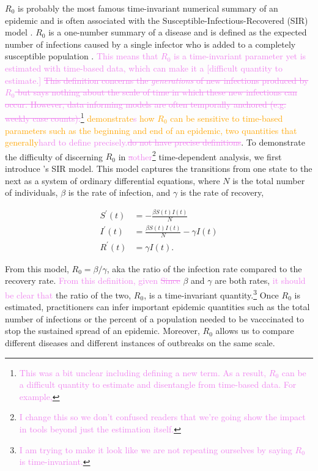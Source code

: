 \documentclass[
  shortnames]{jss}
\begin{document}
\(R_0\) is probably the most famous time-invariant numerical summary of
an epidemic and is often associated with the
Susceptible-Infectious-Recovered (SIR) model \citep{hethcote2000}.
\(R_0\) is a one-number summary of a disease and is defined as the
expected number of infections caused by a single infector who is added
to a completely susceptible population \citep{anderson1992}.
\textcolor{violet}{This means that $R_0$ is a time-invariant parameter yet is estimated with time-based data, which can make it a [difficult quantity to estimate.]}
\textcolor{violet}{\sout{This definition concerns the \textit{generations} of new infections produced by $R_0$ but says nothing about the scale of time in which these new infections can occur.  However, data informing models are often temporally anchored (e.g. weekly case counts).}}\footnote{\textcolor{violet}{This was a bit unclear including defining a new term.   As a result, $R_0$ can be a difficult quantity to estimate and disentangle from time-based data.  For example,}}\textcolor{orange}{ \cite{Gallagher2020} demonstrate\textcolor{violet}{s} how $R_0$ can be sensitive to time-based parameters such as the beginning and end of an epidemic, two quantities that generally}\textcolor{violet}{hard to define precisely.\sout{do not have precise definitions}}.
To demonstrate the difficulty of discerning \(R_0\) in
\textcolor{violet}{\sout{a}other}\footnote{\textcolor{violet}{I change this so we don't confused readers that we're going show the impact in tools beyond just the estimation itself.}}
time-dependent analysis, we first introduce \citet{Kermack1927}'s SIR
model. This model captures the transitions from one state to the next as
a system of ordinary differential equations, where \(N\) is the total
number of individuals, \(\beta\) is the rate of infection, and
\(\gamma\) is the rate of recovery,

\begin{align}\label{eq:sir-ode}
    S^\prime(t) &= -\frac{\beta S(t)I(t)}{N} \\
    I^\prime(t) &= \frac{\beta S(t)I(t)}{N} - \gamma I(t) \nonumber\\
    R^\prime(t) &= \gamma I(t) \nonumber.
\end{align}

From this model, \(R_0 = \beta/\gamma\), aka the ratio of the infection
rate compared to the recovery rate.
\textcolor{violet}{From this definition, given 
\sout{Since}} \(\beta\) and \(\gamma\) are both rates,
\textcolor{violet}{it should be clear that} the ratio of the two,
\(R_0\), is a time-invariant
quantity.\footnote{\textcolor{violet}{I am trying to make it look like we are not repeating ourselves by saying $R_0$ is time-invariant.}}
Once \(R_0\) is estimated, practitioners can infer important epidemic
quantities such as the total number of infections or the percent of a
population needed to be vacccinated to stop the sustained spread of an
epidemic. Moreover, \(R_0\) allows us to compare different diseases and
different instances of outbreaks on the same scale.
\end{document}
